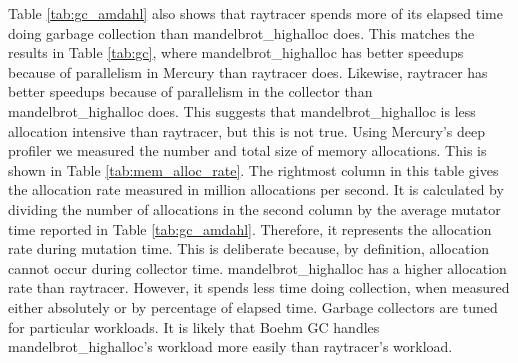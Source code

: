 Table \ref{tab:gc_amdahl} also shows that raytracer spends more of its
elapsed time doing garbage collection than mandelbrot\_highalloc does.
This matches the results in Table \ref{tab:gc},
where mandelbrot\_highalloc has better speedups because of parallelism in
Mercury than raytracer does.
Likewise,
raytracer has better speedups because of parallelism in the collector
than mandelbrot\_highalloc does.
This suggests that mandelbrot\_highalloc is less allocation intensive than
raytracer,
but this is not true.
Using Mercury's deep profiler we measured the number and total size of memory
allocations.
This is shown in Table \ref{tab:mem_alloc_rate}.
The rightmost column in this table gives the allocation rate
measured in million allocations per second.
It is calculated by dividing the number of allocations in the second column
by the average mutator time reported in Table \ref{tab:gc_amdahl}.
Therefore, it represents the allocation rate during mutation time.
This is deliberate because,
by definition,
allocation cannot occur during collector time.
mandelbrot\_highalloc has a higher allocation rate than raytracer.
However,
it spends less time doing collection, when measured either absolutely
or by percentage of elapsed time.
Garbage collectors are tuned for particular workloads.
It is likely that Boehm GC handles mandelbrot\_highalloc's workload more
easily than raytracer's workload.




